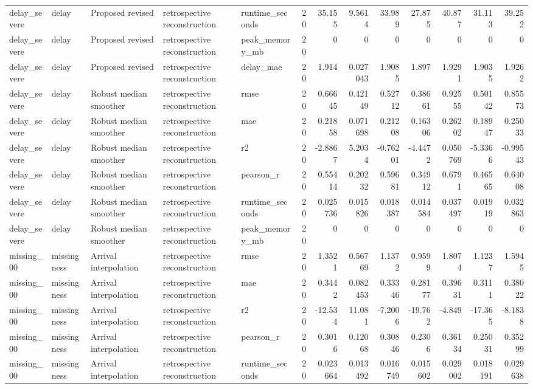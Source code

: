 \begin{table}[!htbp]
{{\begin{tabular}{lllllrrrrrrrr}
delay_severe & delay & Proposed revised & retrospective reconstruction & runtime_seconds & 20 & 35.155 & 9.5614 & 33.989 & 27.875 & 40.877 & 31.113 & 39.252 \\
delay_severe & delay & Proposed revised & retrospective reconstruction & peak_memory_mb & 20 & 0 & 0 & 0 & 0 & 0 & 0 & 0 \\
delay_severe & delay & Proposed revised & retrospective reconstruction & delay_mae & 20 & 1.914 & 0.027043 & 1.9085 & 1.897 & 1.9291 & 1.9035 & 1.9262 \\
delay_severe & delay & Robust median smoother & retrospective reconstruction & rmse & 20 & 0.66645 & 0.42149 & 0.52712 & 0.38661 & 0.92555 & 0.50142 & 0.85573 \\
delay_severe & delay & Robust median smoother & retrospective reconstruction & mae & 20 & 0.21858 & 0.071698 & 0.21208 & 0.16306 & 0.26202 & 0.18947 & 0.25033 \\
delay_severe & delay & Robust median smoother & retrospective reconstruction & r2 & 20 & -2.8867 & 5.2034 & -0.76201 & -4.4472 & 0.050769 & -5.3366 & -0.99543 \\
delay_severe & delay & Robust median smoother & retrospective reconstruction & pearson_r & 20 & 0.55414 & 0.20232 & 0.59681 & 0.34912 & 0.6791 & 0.46565 & 0.64008 \\
delay_severe & delay & Robust median smoother & retrospective reconstruction & runtime_seconds & 20 & 0.025736 & 0.015826 & 0.018387 & 0.014584 & 0.037497 & 0.01919 & 0.032863 \\
delay_severe & delay & Robust median smoother & retrospective reconstruction & peak_memory_mb & 20 & 0 & 0 & 0 & 0 & 0 & 0 & 0 \\
missing_00 & missingness & Arrival interpolation & retrospective reconstruction & rmse & 20 & 1.3521 & 0.56769 & 1.1372 & 0.9599 & 1.8074 & 1.1237 & 1.5945 \\
missing_00 & missingness & Arrival interpolation & retrospective reconstruction & mae & 20 & 0.3442 & 0.082453 & 0.33346 & 0.28177 & 0.39631 & 0.3111 & 0.38022 \\
missing_00 & missingness & Arrival interpolation & retrospective reconstruction & r2 & 20 & -12.534 & 11.081 & -7.2006 & -19.762 & -4.849 & -17.365 & -8.1838 \\
missing_00 & missingness & Arrival interpolation & retrospective reconstruction & pearson_r & 20 & 0.3016 & 0.12068 & 0.30846 & 0.2306 & 0.36134 & 0.25031 & 0.35299 \\
missing_00 & missingness & Arrival interpolation & retrospective reconstruction & runtime_seconds & 20 & 0.023664 & 0.013492 & 0.016749 & 0.015602 & 0.029002 & 0.018191 & 0.029638 \\

\end{tabular}}}
\end{table}
